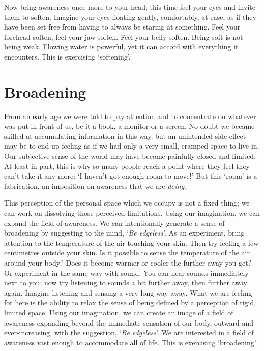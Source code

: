 Now bring awareness once more to your head; this time feel your eyes and
invite them to soften. Imagine your eyes floating gently, comfortably,
at ease, as if they have been set free from having to always be staring
at something. Feel your forehead soften, feel your jaw soften. Feel your
belly soften. Being soft is not being weak. Flowing water is powerful,
yet it can accord with everything it encounters. This is exercising
`softening'.

\section{Broadening}

From an early age we were told to pay attention and to concentrate on
whatever was put in front of us, be it a book, a monitor or a screen. No
doubt we became skilled at accumulating information in this way, but an
unintended side effect may be to end up feeling as if we had only a very
small, cramped space to live in. Our subjective sense of the world may
have become painfully closed and limited. At least in part, this is why
so many people reach a point where they feel they can't take it any
more: `I haven't got enough room to move!' But this `room' is a
fabrication, an imposition on awareness that we are \emph{doing}.

This perception of the personal space which we occupy is not a fixed
thing; we can work on dissolving those perceived limitations. Using our
imagination, we can expand the field of awareness. We can intentionally
generate a sense of broadening by suggesting to the mind, `\emph{Be
edgeless}'. As an experiment, bring attention to the temperature of the
air touching your skin. Then try feeling a few centimetres outside your
skin. Is it possible to sense the temperature of the air around your
body? Does it become warmer or cooler the further away you get? Or
experiment in the same way with sound. You can hear sounds immediately
next to you; now try listening to sounds a bit further away, then
further away again. Imagine listening and sensing a very long way away.
What we are feeling for here is the ability to relax the sense of being
defined by a perception of rigid, limited space. Using our imagination,
we can create an image of a field of awareness expanding beyond the
immediate sensation of our body, outward and ever-increasing, with the
suggestion, `\emph{Be edgeless}'.
We are interested in a field of awareness vast enough to
accommodate all of life. This is exercising `broadening'.

